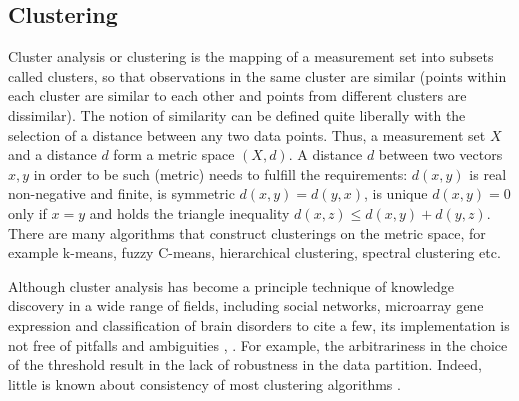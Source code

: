 \documentclass[onecollarge,runningheads]{svjour2}
\begin{document}
\subsection{Clustering}

Cluster analysis or clustering is the mapping of a measurement set into subsets called clusters, so that observations in the same cluster are similar (points within each cluster are similar to each other and points from different clusters are dissimilar).
The notion of similarity can be defined quite liberally with the selection of a distance between any two data points. Thus, a measurement set $X$ and a distance $d$ form a metric space $(X,d)$. 
A distance $d$ between two vectors $x,y$ in order to be such (metric) needs to fulfill the requirements: $d(x,y)$ is real non-negative and finite, is symmetric $d(x,y)=d(y,x)$, is unique $d(x,y)=0$ only if $x=y$ and holds the triangle inequality $d(x,z) \leq  d(x,y) + d(y,z)$.
There are many algorithms that construct clusterings on the metric space, for example k-means, fuzzy C-means, hierarchical clustering, spectral clustering etc. 

Although cluster analysis has become a principle technique of knowledge discovery in a wide range of fields, including social networks, microarray gene expression \cite{nugent2010overview} and classification of brain disorders \cite{arbabshirani2017single} to cite a few, its implementation is not free of pitfalls and ambiguities \cite{carlsson2009topology}, \cite{ronan2016avoiding}.
For example, the arbitrariness in the choice of the threshold result in the lack of robustness in the data partition. Indeed, little is known
about consistency of most clustering algorithms \cite{von2008consistency}.
\end{document}
